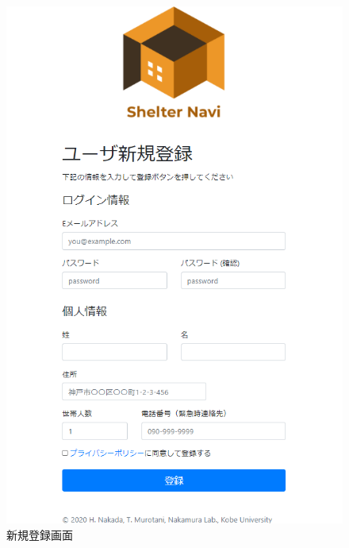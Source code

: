 \documentclass[technicalreport,dvipdfmx]{ieicej}
\begin{document}
\begin{figure}[htbp]
     \begin{center}
          \includegraphics[scale=0.5,pagebox=cropbox,clip]{img/signup.png}
          \caption{新規登録画面}
          \label{fig:signup}
     \end{center}
\end{figure}
\end{document}
